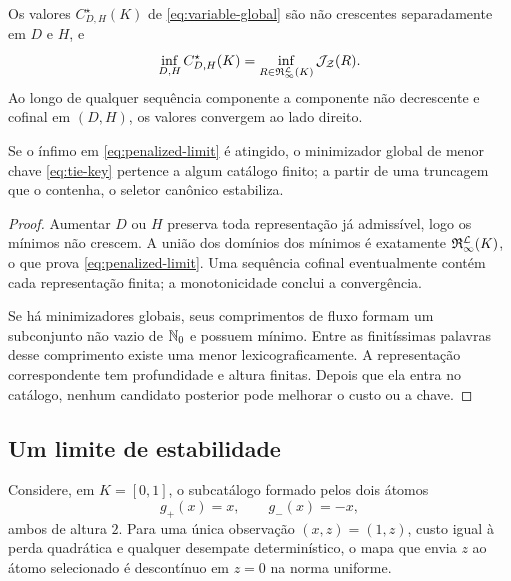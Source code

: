 \begin{proposition}
\label{prop:truncation-convergence}
Os valores $C_{D,H}^{\star}(K)$ de \eqref{eq:variable-global} são não
crescentes separadamente em $D$ e $H$, e
\begin{equation}
 \inf_{D,H}C_{D,H}^{\star}(K)
 =\inf_{R\in\mathfrak{R}_{\infty}^{\mathcal{L}}(K)}
   \mathcal{J}_{\mathcal Z}(R).
 \label{eq:penalized-limit}
\end{equation}
Ao longo de qualquer sequência componente a componente não decrescente e
cofinal em $(D,H)$, os valores convergem ao lado direito.

Se o ínfimo em \eqref{eq:penalized-limit} é atingido, o minimizador global de
menor chave \eqref{eq:tie-key} pertence a algum catálogo finito; a partir de
uma truncagem que o contenha, o seletor canônico estabiliza.
\end{proposition}

\begin{proof}
Aumentar $D$ ou $H$ preserva toda representação já admissível, logo os
mínimos não crescem. A união dos domínios dos mínimos é exatamente
$\mathfrak{R}_{\infty}^{\mathcal{L}}(K)$, o que prova
\eqref{eq:penalized-limit}. Uma sequência cofinal eventualmente contém cada
representação finita; a monotonicidade conclui a convergência.

Se há minimizadores globais, seus comprimentos de fluxo formam um subconjunto
não vazio de $\mathbb{N}_0$ e possuem mínimo. Entre as finitíssimas palavras desse
comprimento existe uma menor lexicograficamente. A representação
correspondente tem profundidade e altura finitas. Depois que ela entra no
catálogo, nenhum candidato posterior pode melhorar o custo ou a chave.
\end{proof}

\subsection{Um limite de estabilidade}

\begin{proposition}
\label{prop:instability}
Considere, em $K=[0,1]$, o subcatálogo formado pelos dois átomos
\[
 g_+(x)=x,\qquad g_-(x)=-x,
\]
ambos de altura $2$. Para uma única observação $(x,z)=(1,z)$, custo igual à
perda quadrática e qualquer desempate determinístico, o mapa que envia $z$ ao
átomo selecionado é descontínuo em $z=0$ na norma uniforme.
\end{proposition}

